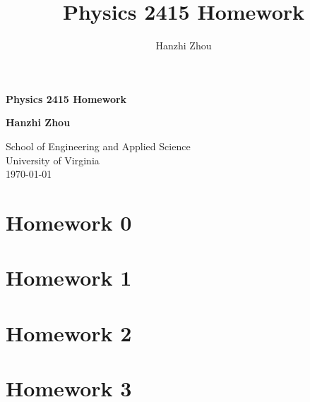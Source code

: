 \documentclass[12pt]{article}
\title{Physics 2415 Homework}
\author{Hanzhi Zhou}
\begin{document}
\begin{titlepage}
  \begin{center}
      \vspace*{1cm}

      \Huge\textbf{Physics 2415 Homework}

 
      \vspace{1.5cm}

      \textbf{Hanzhi Zhou}

      \vfill
      \vspace{0.8cm}

      \Large
      School of Engineering and Applied Science\\
      \vspace{0.2cm}
      University of Virginia\\
      \vspace{0.2cm}
      \today
  \end{center}
  \clearpage
\end{titlepage}

\doublespacing
\tableofcontents
\newpage
\singlespacing

\section{Homework 0}



\newpage

\section{Homework 1}




\newpage

\section{Homework 2}




\newpage

\section{Homework 3}



\end{document}
